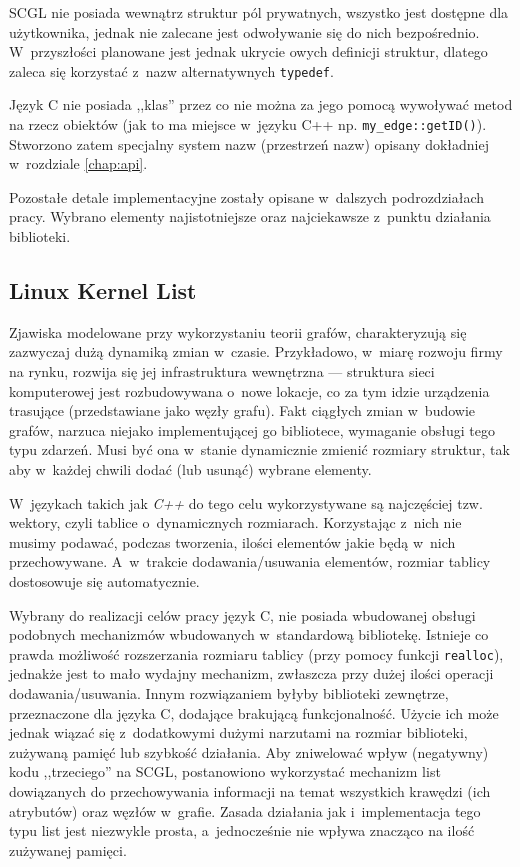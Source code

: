 \documentclass[a4paper,12pt,polish,twoside,openright]{thesis}
\newcommand\code[1]{\lstinline[style=line]{#1}}
\begin{document}
SCGL nie posiada wewnątrz struktur pól prywatnych, wszystko jest dostępne dla użytkownika, jednak nie zalecane jest odwoływanie się do nich bezpośrednio.
W~przyszłości planowane jest jednak ukrycie owych definicji struktur, dlatego zaleca się korzystać z~nazw alternatywnych \code{typedef}.

Język C nie posiada ,,klas'' przez co nie można za jego pomocą wywoływać metod na rzecz obiektów (jak to ma miejsce w~języku C++ np. \code{my_edge::getID()}).
Stworzono zatem specjalny system nazw (przestrzeń nazw) opisany dokładniej w~rozdziale \ref{chap:api}.

Pozostałe detale implementacyjne zostały opisane w~dalszych podrozdziałach pracy.
Wybrano elementy najistotniejsze oraz najciekawsze z~punktu działania biblioteki.

\subsection{Linux Kernel List}
\label{chap:lists}
Zjawiska modelowane przy wykorzystaniu teorii grafów, charakteryzują się zazwyczaj dużą dynamiką zmian w~czasie.
Przykładowo, w~miarę rozwoju firmy na rynku, rozwija się jej infrastruktura wewnętrzna --- struktura sieci komputerowej jest rozbudowywana o~nowe lokacje, co za tym idzie urządzenia trasujące (przedstawiane jako węzły grafu).
Fakt ciągłych zmian w~budowie grafów, narzuca niejako implementującej go bibliotece, wymaganie obsługi tego typu zdarzeń.
Musi być ona w~stanie dynamicznie zmienić rozmiary struktur, tak aby w~każdej chwili dodać (lub usunąć) wybrane elementy.

W~językach takich jak \emph{C++} do tego celu wykorzystywane są najczęściej tzw. wektory, czyli tablice o~dynamicznych rozmiarach.
Korzystając z~nich nie musimy podawać, podczas tworzenia, ilości elementów jakie będą w~nich przechowywane.
A~w~trakcie dodawania/usuwania elementów, rozmiar tablicy dostosowuje się automatycznie.

Wybrany do realizacji celów pracy język C, nie posiada wbudowanej obsługi podobnych mechanizmów wbudowanych w~standardową bibliotekę.
Istnieje co prawda możliwość rozszerzania rozmiaru tablicy (przy pomocy funkcji \code{realloc}), jednakże jest to mało wydajny mechanizm, zwłaszcza przy dużej ilości operacji dodawania/usuwania.
Innym rozwiązaniem byłyby biblioteki zewnętrze, przeznaczone dla języka C, dodające brakującą funkcjonalność.
Użycie ich może jednak wiązać się z~dodatkowymi dużymi narzutami na rozmiar biblioteki, zużywaną pamięć lub szybkość działania.
Aby zniwelować wpływ (negatywny) kodu ,,trzeciego'' na SCGL, postanowiono wykorzystać mechanizm list dowiązanych do przechowywania informacji na temat wszystkich krawędzi (ich atrybutów) oraz węzłów w~grafie.
Zasada działania jak i~implementacja tego typu list jest niezwykle prosta, a~jednocześnie nie wpływa znacząco na ilość zużywanej pamięci.
\end{document}
